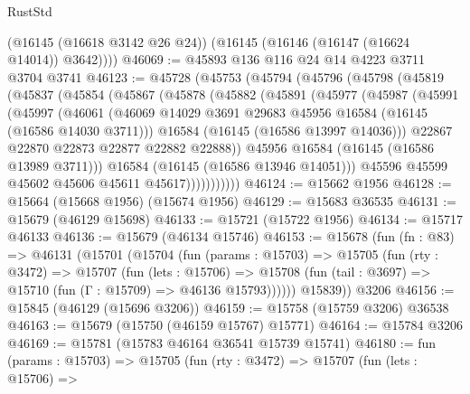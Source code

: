 \begin{lexlean}{RustStd}
\begin{coremodule}
        (@16145 (@16618 @3142 @26 @24))
        (@16145 (@16146 (@16147 (@16624 @14014)) @3642))))
@46069 := @45893 @136 @116 @24 @14 @4223 @3711 @3704 @3741
@46123 := @45728
    (@45753
      (@45794
        (@45796
          (@45798
            (@45819
              (@45837
                (@45854
                  (@45867
                    (@45878
                      (@45882
                        (@45891
                          (@45977
                            (@45987
                              (@45991
                                (@45997
                                  (@46061
                                    (@46069
                                      @14029
                                      @3691
                                      @29683
                                      @45956
                                      @16584
                                      (@16145 (@16586 @14030 @3711)))
                                    @16584
                                    (@16145 (@16586 @13997 @14036)))
                                  @22867
                                  @22870
                                  @22873
                                  @22877
                                  @22882
                                  @22888))
                              @45956
                              @16584
                              (@16145 (@16586 @13989 @3711)))
                            @16584
                            (@16145 (@16586 @13946 @14051)))
                          @45596
                          @45599
                          @45602
                          @45606
                          @45611
                          @45617)))))))))))
@46124 := @15662 @1956
@46128 := @15664 (@15668 @1956) (@15674 @1956)
@46129 := @15683 @36535
@46131 := @15679 (@46129 @15698)
@46133 := @15721 (@15722 @1956)
@46134 := @15717 @46133
@46136 := @15679 (@46134 @15746)
@46153 := @15678
    (fun (fn : @83) =>
    @46131
      (@15701
        (@15704
          (fun (params : @15703) =>
          @15705
            (fun (rty : @3472) =>
            @15707
              (fun (lets : @15706) =>
              @15708 (fun (tail : @3697) => @15710 (fun (Γ : @15709) => @46136 @15793))))))
        @15839))
    @3206
@46156 := @15845 (@46129 (@15696 @3206))
@46159 := @15758 (@15759 @3206) @36538
@46163 := @15679 (@15750 (@46159 @15767) @15771)
@46164 := @15784 @3206
@46169 := @15781 (@15783 @46164 @36541 @15739 @15741)
@46180 := fun (params : @15703) =>
  @15705
    (fun (rty : @3472) =>
    @15707
      (fun (lets : @15706) =>

\end{coremodule}
\end{lexlean}
